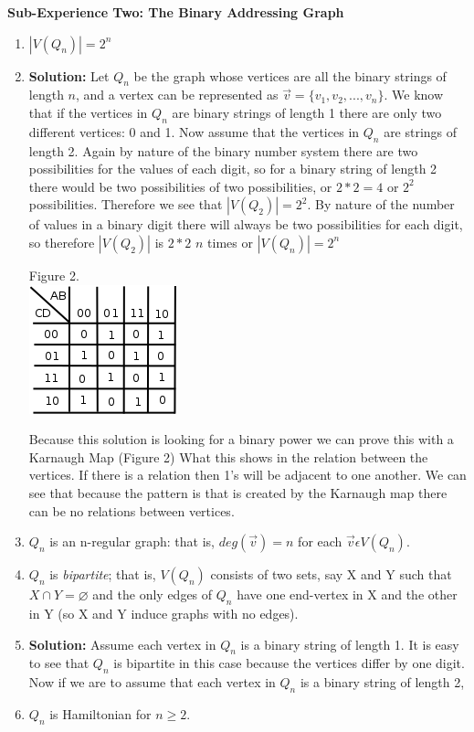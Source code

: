 \documentclass[10pt,a4paper]{report}
\begin{document}
	\textbf{Sub-Experience Two: The Binary Addressing Graph}
		\begin{enumerate}
			\item $|V(Q_n)| = 2^n$
			
			\item[] \textbf{Solution: }Let $Q_{n}$ be the graph whose vertices are all the binary strings of length $n$, and a vertex can be represented as $\vec{v} = \{v_{1}, v_{2}, ..., v_{n}\}$.  We know that if the vertices in $Q_{n}$ are binary strings of length 1 there are only two different vertices: 0 and 1.  Now assume that the vertices in $Q_{n}$ are strings of length 2.  Again by nature of the binary number system there are two possibilities for the values of each digit, so for a binary string of length 2 there would be two possibilities of two possibilities, or $2*2=4$ or $2^{2}$ possibilities.  Therefore we see that $|V(Q_{2})| = 2^{2}$. By nature of the number of values in a binary digit there will always be two possibilities for each digit, so therefore $|V(Q_{2})|$ is $2 * 2$ $n$ times or $|V(Q_{n})|=2^{n}$
			
			\begin{center}
				Figure 2.\\
				\includegraphics[scale=.5]{2_1.png}
			\end{center}
			Because this solution is looking for a binary power we can prove this with a Karnaugh Map (Figure 2) What this shows in the relation between the vertices.  If there is a relation then 1's will be adjacent to one another.  We can see that because the pattern is that is created by the Karnaugh map there can be no relations between vertices.
			\item $Q_n$ is an n-regular graph: that is, $deg (\vec{v}) = n $ for each $\vec{v} \epsilon V(Q_n)$.
			\item $Q_n$ is \textit{bipartite}; that is, $V(Q_n)$ consists of two sets, say X and Y such that $X\cap Y = \varnothing$ and the only edges of $Q_n$ have one end-vertex in X and the other in Y (so X and Y induce graphs with no edges).
			
			\item[]\textbf{Solution: }Assume each vertex in $Q_{n}$ is a binary string of length 1.  It is easy to see that $Q_{n}$ is bipartite in this case because the vertices differ by one digit.  Now if we are to assume that each vertex in $Q_{n}$ is a binary string of length 2, 
			
			\item $Q_n$ is Hamiltonian for $n \geq 2$.
		\end{enumerate}
		
\end{document}
